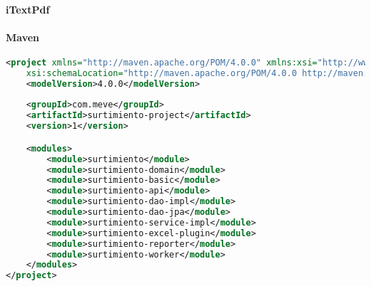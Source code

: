 \paragraph{iTextPdf}\cite{iTextInAction}

\paragraph{Maven}\cite{MasteringApacheMaven3}
\begin{lstlisting}[language=XML, caption={Proyecto padre de Maven}, label={lst:maven-parent-project}]
<project xmlns="http://maven.apache.org/POM/4.0.0" xmlns:xsi="http://www.w3.org/2001/XMLSchema-instance"
	xsi:schemaLocation="http://maven.apache.org/POM/4.0.0 http://maven.apache.org/xsd/maven-4.0.0.xsd">
	<modelVersion>4.0.0</modelVersion>
	
	<groupId>com.meve</groupId>
	<artifactId>surtimiento-project</artifactId>
	<version>1</version>

	<modules>
		<module>surtimiento</module>
		<module>surtimiento-domain</module>
		<module>surtimiento-basic</module>
		<module>surtimiento-api</module>
		<module>surtimiento-dao-impl</module>
		<module>surtimiento-dao-jpa</module>
		<module>surtimiento-service-impl</module>
		<module>surtimiento-excel-plugin</module>
		<module>surtimiento-reporter</module>
		<module>surtimiento-worker</module>
	</modules>
</project>
\end{lstlisting}


